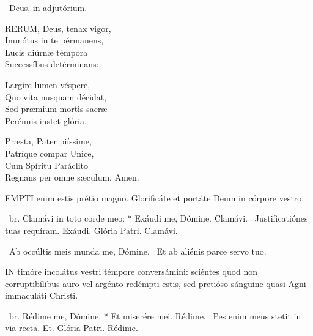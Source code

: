 \V\ Deus, in adjutórium.


\lettrine[lines=2]{R}{ERUM}, Deus, tenax vigor,\\
Immótus in te pérmanens,\\
Lucis diúrnæ témpora\\
Successíbus detérminans:

Largíre lumen véspere,\\
Quo vita nusquam décidat,\\
Sed præmium mortis sacræ\\
Perénnis instet glória.

Præsta, Pater piíssime,\\
Patríque compar Unice,\\
Cum Spíritu Paráclito\\
Regnans per omne sæculum. Amen.





\lettrine[lines=2]{E}{MPTI} enim estis prétio magno. Glorificáte et portáte Deum in córpore vestro.

\R\ br. Clamávi in toto corde meo: * Exáudi me, Dómine. Clamávi. \V\ Justificatiónes tuas requíram. Exáudi. Glória Patri. Clamávi.

\V\ Ab occúltis meis munda me, Dómine. \R\ Et ab aliénis parce servo tuo.




\lettrine[lines=2]{I}{N} timóre incolátus vestri témpore conversámini: sciéntes quod non corruptibílibus auro vel argénto redémpti estis, sed pretióso sánguine quasi Agni immaculáti Christi.

\R\ br. Rédime me, Dómine, * Et miserére mei. Rédime. \V\ Pes enim meus stetit in via recta. Et. Glória Patri. Rédime.

